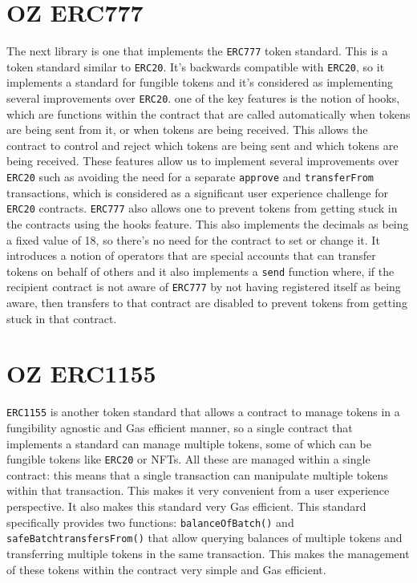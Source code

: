 \section{OZ ERC777}
The next library is one that implements the \verb|ERC777| token standard. This is a token standard similar to \verb|ERC20|. It's backwards compatible with \verb|ERC20|, so it implements a standard for fungible tokens and it's considered as implementing several improvements over \verb|ERC20|. one of the key features is the notion of hooks, which are functions within the contract that are called automatically when tokens are being sent from it, or when tokens are being received. This allows the contract to control and reject which tokens are being sent and which tokens are being received. These features allow us to implement several improvements over \verb|ERC20| such as avoiding the need for a separate \verb|approve| and \verb|transferFrom| transactions, which is considered as a significant user experience challenge for \verb|ERC20| contracts. \verb|ERC777| also allows one to prevent tokens from getting stuck in the contracts using the hooks feature. This also implements the decimals as being a fixed value of 18, so there's no need for the contract to set or change it. It introduces a notion of operators that are special accounts that can transfer tokens on behalf of others and it also implements a \verb|send| function where, if the recipient contract is not aware of \verb|ERC777| by not having registered itself as being aware, then transfers to that contract are disabled to prevent tokens from getting stuck in that contract.

\section{OZ ERC1155}
\verb|ERC1155| is another token standard that allows a contract to manage tokens in a fungibility agnostic and Gas efficient manner, so a single contract that implements a standard can manage multiple tokens, some of which can be fungible tokens like \verb|ERC20| or NFTs. All these are managed within a single contract: this means that a single transaction can manipulate multiple tokens within that transaction. This makes it very convenient from a user experience perspective. It also makes this standard very Gas efficient. This standard specifically provides two functions: \verb|balanceOfBatch()| and \verb|safeBatchtransfersFrom()| that allow querying balances of multiple tokens and transferring multiple tokens in the same transaction. This makes the management of these tokens within the contract very simple and Gas efficient.

